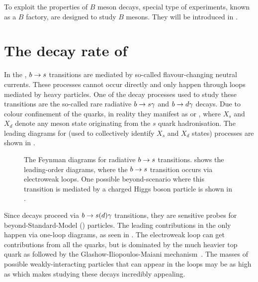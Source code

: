 To exploit the properties of $B$ meson decays, special type of experiments, known as a $B$ factory, are designed to study $B$ mesons.
They will be introduced in .

\section{The decay rate of \texorpdfstring{\BtoXsdgamma}{B->Xsg}}\label{sec:btosgamma_totalrate_theory}

In the \SM, $b\rightarrow s$ transitions are mediated by so-called flavour-changing neutral currents.
These processes cannot occur directly and only happen through loops mediated by heavy particles.
One of the decay processes used to study these transitions are the so-called rare radiative $b\rightarrow s\gamma$ and $b\rightarrow d\gamma$ decays.
Due to colour confinement of the quarks, in reality they manifest as \BtoXsgamma or \BtoXdgamma, where $X_s$ and $X_d$ denote any meson state originating from the $s$ quark hadronisation.
The leading \SM diagrams for \BtoXsdgamma (used to collectively identify $X_s$ and $X_d$ states) processes are shown in .

\begin{figure}[htbp!]
\resizebox{0.66\textwidth}{!}{
    \subcaptionbox{\label{fig:sm_diagrams}}{
        
        
    }
}
\resizebox{0.33\textwidth}{!}{
\subcaptionbox{\label{fig:bsm_diagrams}}{
    
}
}
\caption{\label{fig:b_to_s_gamma_diagrams}
The Feynman diagrams for radiative $b\rightarrow s$ transitions. 
 shows the leading-order \SM diagrams, where the $b\rightarrow s$ transition occurs via electroweak loops.
One possible beyond-\SM scenario where this transition is mediated by a charged Higgs boson particle is shown in .
}
\end{figure}

Since \BtoXsdgamma decays proceed via $b\rightarrow s(d)\gamma$ transitions, they are sensitive probes for beyond-Standard-Model (\BSM) particles. 
The leading contributions in the \SM only happen via one-loop diagrams, as seen in .
The electroweak loop can get contributions from all the quarks, but is dominated by the much heavier top quark \cite{Mannel:2001vn} as followed by the Glashow-Iliopoulos-Maiani mechanism~\cite{Glashow:1970gm}. 
The masses of possible \BSM weakly-interacting particles that can appear in the loops may be as high as  \cite{Misiak:2020vlo} which makes studying these decays incredibly appealing.

